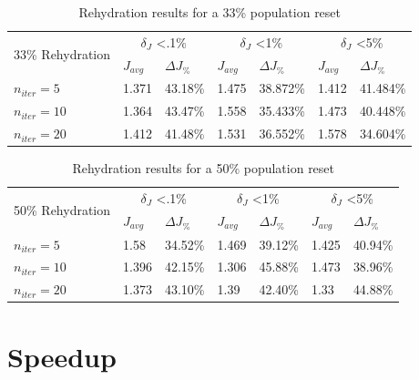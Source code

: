 \begin{table}[H]
  \centering
  \begin{tabular}{lll|ll|ll}
    \toprule
    \multirow{2}{*}{33\% Rehydration} &
      \multicolumn{2}{c}{$\delta_{J}$ \textless .1\%} &
      \multicolumn{2}{c}{$\delta_{J}$ \textless 1\%} &
      \multicolumn{2}{c}{$\delta_{J}$ \textless 5\%} \\
      \cmidrule{2-7}
    & $J_{avg}$ & $\Delta J_{\%}$ & $J_{avg}$ & $\Delta J_{\%}$ & $J_{avg}$ & $\Delta J_{\%}$ \\
    \midrule

    $n_{iter}=5$ & 1.371 & 43.18\% & 1.475 & 38.872\% & 1.412 & 41.484\% \\
    $n_{iter}=10$ & 1.364 & 43.47\% & 1.558 & 35.433\% & 1.473 & 40.448\% \\
    $n_{iter}=20$ & 1.412 & 41.48\% & 1.531 & 36.552\% & 1.578 & 34.604\% \\
    \bottomrule
  \end{tabular}
  \caption{Rehydration results for a 33\% population reset}
  \label{tab:rehydation-p33}
\end{table}


\begin{table}[H]
    \centering
    \begin{tabular}{lll|ll|ll}
      \toprule
      \multirow{2}{*}{50\% Rehydration} &
        \multicolumn{2}{c}{$\delta_{J}$ \textless .1\%} &
        \multicolumn{2}{c}{$\delta_{J}$ \textless 1\%} &
        \multicolumn{2}{c}{$\delta_{J}$ \textless 5\%} \\
        \cmidrule{2-7}
      & $J_{avg}$ & $\Delta J_{\%}$ & $J_{avg}$ & $\Delta J_{\%}$ & $J_{avg}$ & $\Delta J_{\%}$ \\
      \midrule

      $n_{iter}=5$ & 1.58 & 34.52\% & 1.469 & 39.12\% & 1.425 & 40.94\% \\
      $n_{iter}=10$ & 1.396 & 42.15\% & 1.306 & 45.88\% & 1.473 & 38.96\% \\
      $n_{iter}=20$ & 1.373 & 43.10\% & 1.39 & 42.40\% & 1.33 & 44.88\% \\
      \bottomrule
    \end{tabular}
    \caption{Rehydration results for a 50\% population reset}
    \label{tab:rehydation-p50}
  \end{table}

\section{Speedup}

